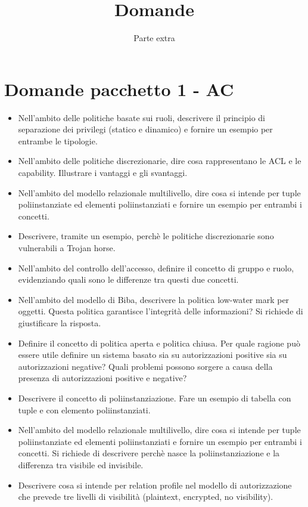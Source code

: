 \documentclass{report}
\title{\huge\textbf{{Domande}}}
\date{Parte extra}
\begin{document}
\maketitle
\tableofcontents
\newpage

\chapter{Domande pacchetto 1 - AC}
\begin{itemize}
    \item Nell'ambito delle politiche basate sui ruoli, descrivere il principio di separazione dei privilegi (statico e dinamico)
e fornire un esempio per entrambe le tipologie.
    \item Nell'ambito delle politiche discrezionarie, dire cosa rappresentano le ACL e le capability. Illustrare i vantaggi
e gli svantaggi.
    \item Nell'ambito del modello relazionale multilivello, dire cosa si intende per tuple poliinstanziate ed elementi
poliinstanziati e fornire un esempio per entrambi i concetti.
    \item Descrivere, tramite un esempio, perchè le politiche discrezionarie sono vulnerabili a Trojan horse.
    \item Nell'ambito del controllo dell'accesso, definire il concetto di gruppo e ruolo, evidenziando quali sono le differenze
tra questi due concetti.
    \item Nell'ambito del modello di Biba, descrivere la politica low-water mark per oggetti. Questa politica garantisce
l'integrità delle informazioni? Si richiede di giustificare la risposta.
    \item Definire il concetto di politica aperta e politica chiusa. Per quale ragione può essere utile definire un sistema
basato sia su autorizzazioni positive sia su autorizzazioni negative? Quali problemi possono sorgere a causa
della presenza di autorizzazioni positive e negative?
    \item Descrivere il concetto di poliinstanziazione. Fare un esempio di tabella con tuple e con elemento poliinstanziati.
    \item Nell'ambito del modello relazionale multilivello, dire cosa si intende per tuple poliinstanziate ed elementi poliinstanziati
e fornire un esempio per entrambi i concetti. Si richiede di descrivere perchè nasce la poliinstanziazione
e la differenza tra visibile ed invisibile.
    \item Descrivere cosa si intende per relation profile nel modello di autorizzazione che prevede tre livelli di visibilità (plaintext, encrypted, no visibility).

\end{itemize}
\end{document}
